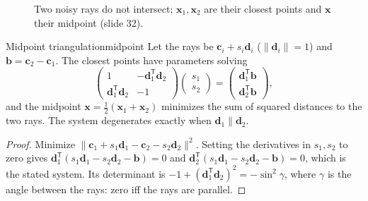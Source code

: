 \documentclass[11pt,a4paper]{article}
\newcommand{\xb}{\bar{\bm{x}}}      %
\newcommand{\norm}[1]{\lVert #1\rVert}
\newcommand{\tr}{^{\mathsf T}}
\begin{document}
\begin{figure}[H]
\centering
{}
\caption{Two noisy rays do not intersect; $\bm x_1,\bm x_2$ are their closest points and $\bm x$ their midpoint (slide 32).}\label{fig:tri}
\end{figure}

\begin{proposition}{Midpoint triangulation}{midpoint}
Let the rays be $\bm c_i+s_i\bm d_i$ ($\norm{\bm d_i}=1$) and $\bm b=\bm c_2-\bm c_1$. The closest points have parameters solving
\[
\begin{pmatrix}1&-\bm d_1\tr\bm d_2\\ \bm d_1\tr\bm d_2&-1\end{pmatrix}\begin{pmatrix}s_1\\s_2\end{pmatrix}=\begin{pmatrix}\bm d_1\tr\bm b\\ \bm d_2\tr\bm b\end{pmatrix},
\]
and the midpoint $\bm x=\tfrac12(\bm x_1+\bm x_2)$ minimizes the sum of squared distances to the two rays. The system degenerates exactly when $\bm d_1\parallel\bm d_2$.
\end{proposition}
\begin{proof}
Minimize $\norm{\bm c_1+s_1\bm d_1-\bm c_2-s_2\bm d_2}^2$. Setting the derivatives in $s_1,s_2$ to zero gives $\bm d_1\tr(s_1\bm d_1-s_2\bm d_2-\bm b)=0$ and $\bm d_2\tr(s_1\bm d_1-s_2\bm d_2-\bm b)=0$, which is the stated system. Its determinant is $-1+(\bm d_1\tr\bm d_2)^2=-\sin^2\gamma$, where $\gamma$ is the angle between the rays: zero iff the rays are parallel.
\end{proof}
\end{document}

